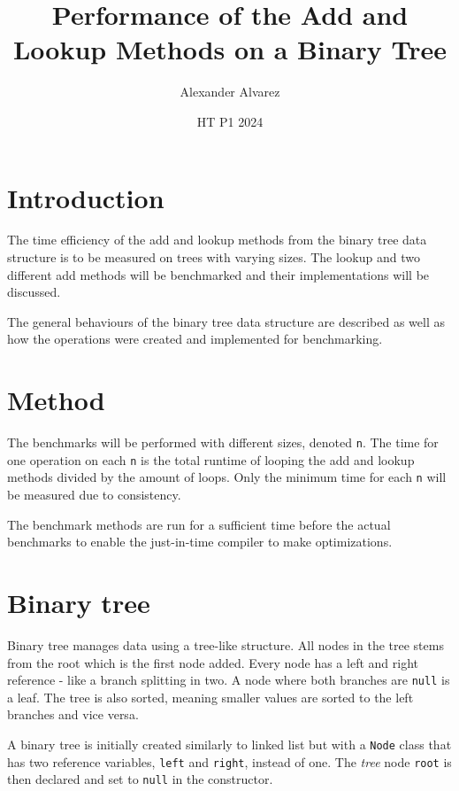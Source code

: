 \documentclass[a4paper,11pt]{article}
\begin{document}
\title{
  \textbf{Performance of the Add and Lookup Methods on a Binary Tree}
}
\author{Alexander Alvarez}
\date{HT P1 2024}

\maketitle

\section*{Introduction}

The time efficiency of the add and lookup methods from the binary tree 
data structure is to be measured on trees with varying sizes. The 
lookup and two different add methods will be benchmarked and their 
implementations will be discussed.

The general behaviours of the binary tree data structure are described 
as well as how the operations were created and implemented for 
benchmarking.

\section*{Method}

The benchmarks will be performed with different sizes, denoted {\tt n}. 
The time for one operation on each {\tt n} is the total runtime of 
looping the add and lookup methods divided by the amount of loops. Only 
the minimum time for each {\tt n} will be measured due to consistency.

The benchmark methods are run for a sufficient time before the actual 
benchmarks to enable the just-in-time compiler to make optimizations.

\section*{Binary tree}

Binary tree manages data using a tree-like structure. All nodes in the 
tree stems from the root which is the first node added. Every node has 
a left and right reference - like a branch splitting in two. A node 
where both branches are {\tt null} is a leaf. The tree is also sorted,
meaning smaller values are sorted to the left branches and vice versa.

A binary tree is initially created similarly to linked list but with a 
{\tt Node} class that has two reference variables, {\tt left} and 
{\tt right}, instead of one. The \emph{tree} node {\tt root} is then 
declared and set to {\tt null} in the constructor.
\end{document}
